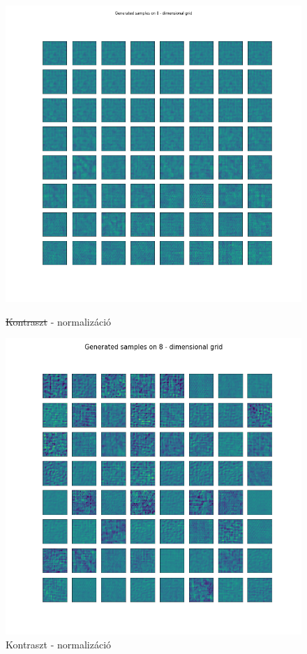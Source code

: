 \documentclass[12pt, english]{article}
\begin{document}
\begin{figure}[H]
\begin{minipage}{0.5\linewidth}
  \end{minipage} 
  \begin{minipage}{0.5\linewidth}
    \centering
    \includegraphics[width=.75\linewidth]{lvae2/18_DenseLadderVAE_contrastNorm-generated_samples.png} 
    \caption{\st{Kontraszt} - normalizáció} 
    \label{fig:lvae-2-contrast-generated-3} 
  \end{minipage}%
  \begin{minipage}{0.5\linewidth}
    \centering
    \includegraphics[width=.75\linewidth]{lvae2/19_DenseLadderVAE_contrastNorm_contrast-generated_samples.png} 
    \caption{Kontraszt - normalizáció} 
    \label{fig:lvae-2-contrast-generated-4} 
  \end{minipage} 
\end{figure}
\end{document}
